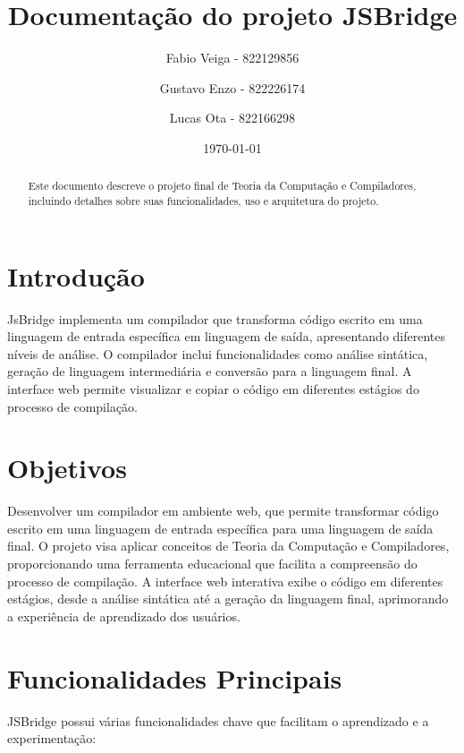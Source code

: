 \documentclass[a4paper,12pt]{article}
\title{Documentação do projeto JSBridge}
\author{Fabio Veiga - 822129856 \and Gustavo Enzo - 822226174 \and Lucas Ota - 822166298}
\date{\today}
\begin{document}
\maketitle

\begin{abstract}
Este documento descreve o projeto final de Teoria da Computação e Compiladores, incluindo detalhes sobre suas funcionalidades, uso e arquitetura do projeto.
\end{abstract}

\tableofcontents
\newpage

\section{Introdução}

JsBridge implementa um compilador que transforma código escrito em uma linguagem de entrada específica em linguagem de saída, apresentando diferentes níveis de análise. O compilador inclui funcionalidades como análise sintática, geração de linguagem intermediária e conversão para a linguagem final. A interface web permite visualizar e copiar o código em diferentes estágios do processo de compilação.

\section{Objetivos}

Desenvolver um compilador em ambiente web, que permite transformar código escrito em uma linguagem de entrada específica para uma linguagem de saída final. O projeto visa aplicar conceitos de Teoria da Computação e Compiladores, proporcionando uma ferramenta educacional que facilita a compreensão do processo de compilação. A interface web interativa exibe o código em diferentes estágios, desde a análise sintática até a geração da linguagem final, aprimorando a experiência de aprendizado dos usuários.

\section{Funcionalidades Principais}

JSBridge possui várias funcionalidades chave que facilitam o aprendizado e a experimentação:
\end{document}
